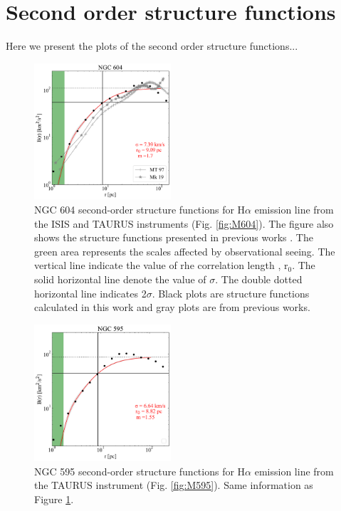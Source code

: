 \documentclass[fleqn,usenatbib, useAMS, a4paper]{mnras}
\begin{document}
\clearpage

\section{Second order structure functions}\label{sec:StructFunct}

Here we present the plots of the second order structure functions...

\begin{figure}
\centering 
\includegraphics[width=2in]{Figures/SFplots/604}
\caption{NGC 604 second-order structure functions for H$\alpha$ emission line from the ISIS and TAURUS instruments (Fig. \ref{fig:M604}). The figure also shows the structure functions presented in previous works \citep{tanco1997,2019arXiv191203543M}. The green area represents the scales affected by observational seeing. The vertical line indicate the value of rhe correlation length , r$_{0}$. The solid horizontal line denote the value of $\sigma$. The double dotted horizontal line indicates 2$\sigma$. Black plots are structure functions calculated in this work and gray plots are from previous works. }
\label{fig:SF604}
\end{figure}

\begin{figure}
\centering 
\includegraphics[width=2in]{Figures/SFplots/595}
\caption{NGC 595 second-order structure functions for H$\alpha$ emission line from the TAURUS instrument (Fig. \ref{fig:M595}). Same information as Figure \ref{fig:SF604}.}
\label{fig:SF595}
\end{figure}
\end{document}

